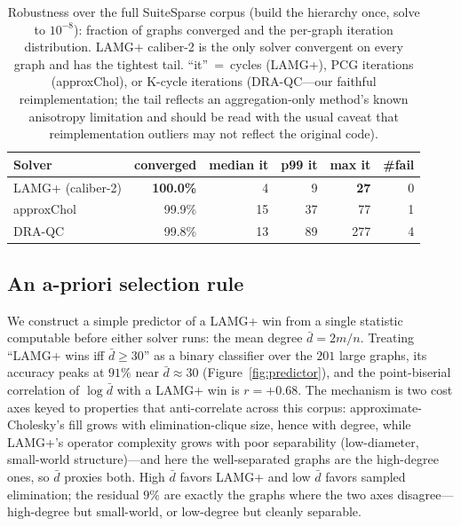 \documentclass[leqno,letterpaper]{etna}
\begin{document}
\begin{table}[t]\centering
\caption{Robustness over the full SuiteSparse corpus (build the hierarchy once, solve to
$10^{-8}$): fraction of graphs converged and the per-graph iteration distribution. LAMG+
caliber-2 is the only solver convergent on every graph and has the tightest tail. ``it''~=~cycles
(LAMG+), PCG iterations (approxChol), or K-cycle iterations (DRA-QC---our faithful
reimplementation; the tail reflects an aggregation-only method's known anisotropy limitation
and should be read with the usual caveat that reimplementation outliers may not reflect the
original code).}\label{tab:draqc}
\begin{tabular}{lrrrrr}
\toprule
Solver & converged & median it & p99 it & max it & \#fail\\
\midrule
LAMG+ (caliber-2)         & \textbf{100.0\%} & 4  & 9  & \textbf{27}  & 0\\
approxChol \cite{gks2023} & 99.9\%           & 15 & 37 & 77           & 1\\
DRA-QC \cite{napov-notay} & 99.8\%           & 13 & 89 & 277          & 4\\
\bottomrule
\end{tabular}
\end{table}

\subsection{An a-priori selection rule}\label{sec:predictor}
We construct a simple predictor of a LAMG+ win from a single statistic computable before either solver
runs: the mean degree $\bar d=2m/n$. Treating ``LAMG+ wins iff $\bar d\ge30$'' as a binary classifier
over the $201$ large graphs, its accuracy peaks at $91\%$ near $\bar d\approx30$
(Figure~\ref{fig:predictor}), and the point-biserial correlation of $\log\bar d$ with a LAMG+ win is
$r=+0.68$. The mechanism is two cost axes keyed to properties that anti-correlate across this corpus:
approximate-Cholesky's fill grows with elimination-clique size, hence with degree, while LAMG+'s
operator complexity grows with poor separability (low-diameter, small-world structure)---and here the
well-separated graphs are the high-degree ones, so $\bar d$ proxies both. High $\bar d$ favors LAMG+
and low $\bar d$ favors sampled elimination; the residual $9\%$ are exactly the graphs where the two
axes disagree---high-degree but small-world, or low-degree but cleanly separable.
\end{document}
